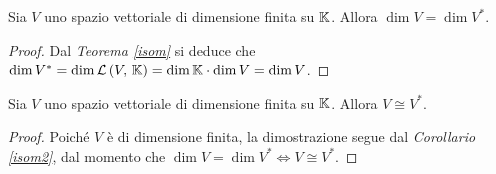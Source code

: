 \documentclass[a4paper]{article}
\newcommand{\dual}[1]{#1^{*}}
\begin{document}
\vskip 10pt

\begin{corollary}
Sia $V$ uno spazio vettoriale di dimensione finita su $\mathbb{K}$.
Allora $\dim V = \dim \dual V$.
\label{isom2}
\end{corollary}

\begin{proof}
Dal \textit{Teorema \ref{isom}} si deduce che
$\dim \dual V = \dim \LL{V}{\KK} = \dim \KK \cdot \dim V =
\dim V$.
\end{proof}

\vskip 10pt

\begin{corollary}
Sia $V$ uno spazio vettoriale di dimensione finita su $\mathbb{K}$.
Allora $V \cong \dual V$.
\label{isom3}
\end{corollary}

\begin{proof}
Poiché $V$ è di dimensione finita, la dimostrazione segue dal
\textit{Corollario \ref{isom2}}, dal momento che
$\dim V = \dim \dual V \iff V \cong \dual V$.
\end{proof}
\end{document}
